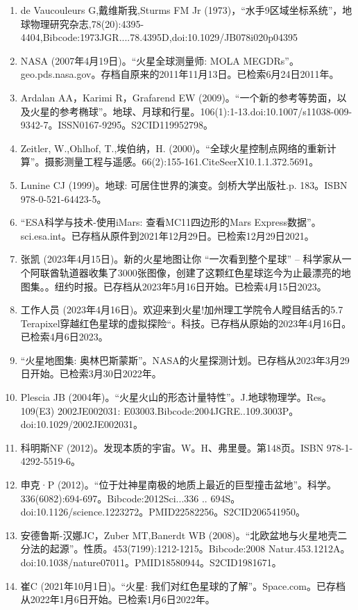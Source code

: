 \begin{enumerate}
\item de Vaucouleurs G,戴维斯我,Sturms FM Jr (1973)，“水手9区域坐标系统”，地球物理研究杂志,78(20):4395-4404,Bibcode:1973JGR....78.4395D,doi:10.1029/JB078i020p04395
\item NASA (2007年4月19日)。“火星全球测量师: MOLA MEGDRs”。geo.pds.nasa.gov。存档自原来的2011年11月13日。已检索6月24日2011年。
\item Ardalan AA，Karimi R，Grafarend EW (2009)。“一个新的参考等势面，以及火星的参考椭球”。地球、月球和行星。106(1):1-13.doi:10.1007/s11038-009-9342-7。ISSN0167-9295。S2CID119952798。  
\item Zeitler, W.,Ohlhof, T.,埃伯纳，H. (2000)。“全球火星控制点网络的重新计算”。摄影测量工程与遥感。66(2):155-161.CiteSeerX10.1.1.372.5691。 
\item Lunine CJ (1999)。地球: 可居住世界的演变。剑桥大学出版社.p. 183。ISBN 978-0-521-64423-5。
\item “ESA科学与技术-使用iMars: 查看MC11四边形的Mars Express数据”。sci.esa.int。已存档从原件到2021年12月29日。已检索12月29日2021。
\item 张凯 (2023年4月15日)。新的火星地图让你 “一次看到整个星球” -- 科学家从一个阿联酋轨道器收集了3000张图像，创建了这颗红色星球迄今为止最漂亮的地图集。。纽约时报。已存档从2023年5月16日开始。已检索4月15日2023。
\item 工作人员 (2023年4月16日)。欢迎来到火星!加州理工学院令人瞠目结舌的5.7 Terapixel穿越红色星球的虚拟探险“。科技。已存档从原始的2023年4月16日。已检索4月6日2023。
\item “火星地图集: 奥林巴斯蒙斯”。NASA的火星探测计划。已存档从2023年3月29日开始。已检索3月30日2022年。
\item Plescia JB (2004年)。“火星火山的形态计量特性”。J.地球物理学。Res。109(E3) 2002JE002031: E03003.Bibcode:2004JGRE..109.3003P。doi:10.1029/2002JE002031。
\item 科明斯NF (2012)。发现本质的宇宙。W。H、弗里曼。第148页。ISBN 978-1-4292-5519-6。
\item 申克·P (2012)。“位于灶神星南极的地质上最近的巨型撞击盆地”。科学。336(6082):694-697。Bibcode:2012Sci...336 .. 694S。doi:10.1126/science.1223272。PMID22582256。S2CID206541950。  
\item 安德鲁斯-汉娜JC，Zuber MT,Banerdt WB (2008)。“北欧盆地与火星地壳二分法的起源”。性质。453(7199):1212-1215。Bibcode:2008 Natur.453.1212A。doi:10.1038/nature07011。PMID18580944。S2CID1981671。  
\item 崔C (2021年10月1日)。“火星: 我们对红色星球的了解”。Space.com。已存档从2022年1月6日开始。已检索1月6日2022年。

\end{enumerate}
